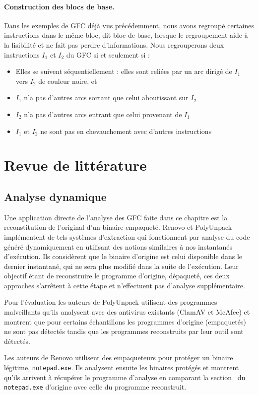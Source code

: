 \paragraph{Construction des blocs de base.}
Dans les exemples de GFC déjà vus précédemment, nous avons regroupé certaines instructions dans le même bloc, dit bloc de base, lorsque le regroupement aide à la lisibilité et ne fait pas perdre d'informations. Nous regrouperons deux instructions $I_1$ et $I_2$ du GFC si et seulement si :
\begin{itemize}
 \item Elles se suivent séquentiellement : elles sont reliées par un arc dirigé de $I_1$ vers $I_2$ de couleur noire, et
 \item $I_1$ n'a pas d'autres arcs sortant que celui aboutissant sur $I_2$
 \item $I_2$ n'a pas d'autres arcs entrant que celui provenant de $I_1$
 \item $I_1$ et $I_2$ ne sont pas en chevauchement avec d'autres instructions
\end{itemize}

\section{Revue de littérature}
\subsection{Analyse dynamique}
Une application directe de l'analyse des GFC faite dans ce chapitre est la reconstitution de l'original d'un binaire empaqueté.
Renovo \cite{renovo} et PolyUnpack \cite{polyunpack} implémentent de tels systèmes d'extraction qui fonctionnent par analyse du code généré dynamiquement en utilisant des notions similaires à nos instantanés d'exécution. Ils considèrent que le binaire d'origine est celui disponible dans le dernier instantané, qui ne sera plus modifié dans la suite de l'exécution.
Leur objectif étant de reconstruire le programme d'origine, dépaqueté, ces deux approches s'arrêtent à cette étape et n'effectuent pas d'analyse supplémentaire. 

Pour l'évaluation les auteurs de PolyUnpack utilisent des programmes malveillants qu'ils analysent avec des antivirus existants (ClamAV et McAfee) et montrent que pour certains échantillons les programmes d'origine (empaquetés) ne sont pas détectés tandis que les programmes reconstruits par leur outil sont détectés.

Les auteurs de Renovo utilisent des empaqueteurs pour protéger un binaire légitime, \texttt{notepad.exe}. Ils analysent ensuite les binaires protégés et montrent qu'ils arrivent à récupérer le programme d'analyse en comparant la section \ptext\ du \texttt{notepad.exe} d'origine avec celle du programme reconstruit.


